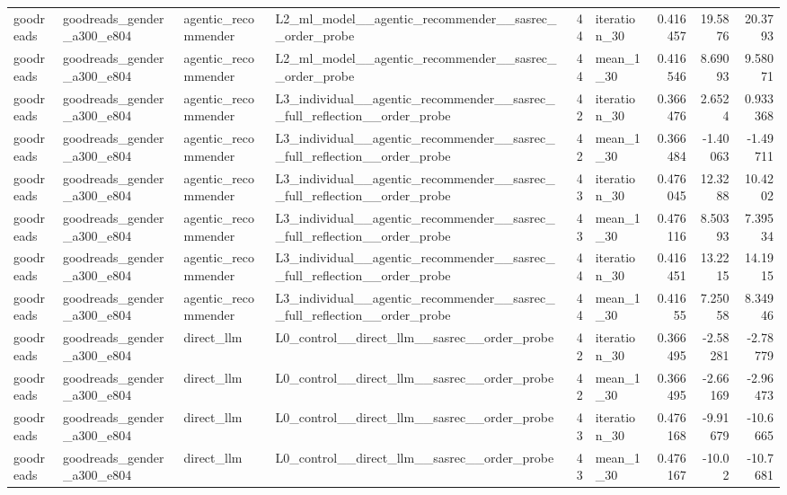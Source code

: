 \begin{table}[htbp!]
\begin{tabular}{llllrlrrr}
goodreads & goodreads\_gender\_a300\_e804 & agentic\_recommender & L2\_ml\_model\_\_agentic\_recommender\_\_sasrec\_\_order\_probe & 44 & iteration\_30 & 0.416457 & 19.5876 & 20.3793 \\
goodreads & goodreads\_gender\_a300\_e804 & agentic\_recommender & L2\_ml\_model\_\_agentic\_recommender\_\_sasrec\_\_order\_probe & 44 & mean\_1\_30 & 0.416546 & 8.69093 & 9.58071 \\
goodreads & goodreads\_gender\_a300\_e804 & agentic\_recommender & L3\_individual\_\_agentic\_recommender\_\_sasrec\_\_full\_reflection\_\_order\_probe & 42 & iteration\_30 & 0.366476 & 2.6524 & 0.933368 \\
goodreads & goodreads\_gender\_a300\_e804 & agentic\_recommender & L3\_individual\_\_agentic\_recommender\_\_sasrec\_\_full\_reflection\_\_order\_probe & 42 & mean\_1\_30 & 0.366484 & -1.40063 & -1.49711 \\
goodreads & goodreads\_gender\_a300\_e804 & agentic\_recommender & L3\_individual\_\_agentic\_recommender\_\_sasrec\_\_full\_reflection\_\_order\_probe & 43 & iteration\_30 & 0.476045 & 12.3288 & 10.4202 \\
goodreads & goodreads\_gender\_a300\_e804 & agentic\_recommender & L3\_individual\_\_agentic\_recommender\_\_sasrec\_\_full\_reflection\_\_order\_probe & 43 & mean\_1\_30 & 0.476116 & 8.50393 & 7.39534 \\
goodreads & goodreads\_gender\_a300\_e804 & agentic\_recommender & L3\_individual\_\_agentic\_recommender\_\_sasrec\_\_full\_reflection\_\_order\_probe & 44 & iteration\_30 & 0.416451 & 13.2215 & 14.1915 \\
goodreads & goodreads\_gender\_a300\_e804 & agentic\_recommender & L3\_individual\_\_agentic\_recommender\_\_sasrec\_\_full\_reflection\_\_order\_probe & 44 & mean\_1\_30 & 0.41655 & 7.25058 & 8.34946 \\
goodreads & goodreads\_gender\_a300\_e804 & direct\_llm & L0\_control\_\_direct\_llm\_\_sasrec\_\_order\_probe & 42 & iteration\_30 & 0.366495 & -2.58281 & -2.78779 \\
goodreads & goodreads\_gender\_a300\_e804 & direct\_llm & L0\_control\_\_direct\_llm\_\_sasrec\_\_order\_probe & 42 & mean\_1\_30 & 0.366495 & -2.66169 & -2.96473 \\
goodreads & goodreads\_gender\_a300\_e804 & direct\_llm & L0\_control\_\_direct\_llm\_\_sasrec\_\_order\_probe & 43 & iteration\_30 & 0.476168 & -9.91679 & -10.6665 \\
goodreads & goodreads\_gender\_a300\_e804 & direct\_llm & L0\_control\_\_direct\_llm\_\_sasrec\_\_order\_probe & 43 & mean\_1\_30 & 0.476167 & -10.02 & -10.7681 \\

\end{tabular}
\end{table}
